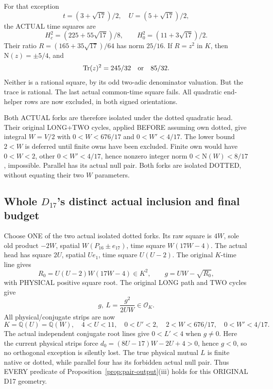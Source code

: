 \documentclass[11pt]{article}
\begin{document}
For that exception
\[
 t=(3+\sqrt{17})/2,\quad U=(5+\sqrt{17})/2,
\]
the ACTUAL time squares are
\[
 H_c^2=(225+55\sqrt{17})/8,\qquad
 H_0^2=(11+3\sqrt{17})/2 .
\]
Their ratio
\(R=(165+35\sqrt{17})/64\) has norm \(25/16\).
If \(R=z^2\) in \(K\), then
\(\mathrm N(z)=\pm5/4\), and
\[
                    \operatorname{Tr}(z)^2=245/32
                                      \quad\hbox{or}\quad85/32 .
\]
Neither is a rational square, by its odd
two-adic denominator valuation.
But the trace is rational.
The last actual common-time square fails.
All quadratic end-helper rows are now excluded,
in both signed orientations.

Both ACTUAL forks are therefore isolated under
the dotted quadratic head.
Their original LONG+TWO cycles, applied BEFORE
assuming own dotted, give integral \(W=V/2\)
with \(0<W<676/17\) and \(0<W'<4/17\).
The lower bound \(2<W\) is deferred until
finite owns have been excluded.
Finite own would have \(0<W<2\), other
\(0<W'<4/17\), hence nonzero integer norm
\(0<\mathrm N(W)<8/17\), impossible.
Parallel has its actual null pair.
Both forks are isolated DOTTED, without
equating their two \(W\) parameters.

\subsection[Whole D17's distinct actual inclusion and final budget]{Whole \(D_{17}\)'s distinct actual inclusion and final budget}
\label{app:arithD17domain}

Choose ONE of the two actual isolated dotted forks.
Its raw square is \(4W\), sole old product
\(-2W\), spatial \(W(P_{16}\pm e_{17})\),
time square \(W(17W-4)\).
The actual head has square \(2U\), spatial
\(Ue_1\), time square \(U(U-2)\).
The original \(K\)-time line gives
\[
 R_0=U(U-2)W(17W-4)\in K^2,\qquad
 g=UW-\sqrt{R_0},
\]
with PHYSICAL positive square root.
The original LONG path and TWO cycles give
\[
                   g,\ L={\frac{g^2}{2UW}}\in\mathcal O_K .
\]
All physical/conjugate strips are now
\[
 K=\mathbb Q(U)=\mathbb Q(W),\quad
 4<U<11,\quad0<U'<2,\quad
 2<W<676/17,\quad0<W'<4/17 .
\]
The actual independent conjugate root lines give
\(0<L'<4\) when \(g\ne0\).
Here the current physical strips force
\(d_0=(8U-17)W-2U+4>0\), hence \(g<0\),
so no orthogonal exception is silently lost.
The true physical mutual \(L\) is finite
native or dotted, while parallel four has
its forbidden actual null pair.
Thus EVERY predicate of
Proposition~\ref{prop:pair-output}(iii) holds
for this ORIGINAL D17 geometry.
\end{document}
